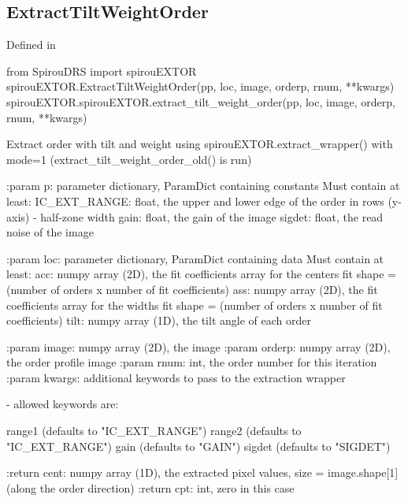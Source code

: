 \begin{minipage}{\textwidth}
\subsection{ExtractTiltWeightOrder}

Defined in \spirouEXTOR{}

\begin{pythonbox}
from SpirouDRS import spirouEXTOR
spirouEXTOR.ExtractTiltWeightOrder(pp, loc, image, orderp, rnum, **kwargs)
spirouEXTOR.spirouEXTOR.extract_tilt_weight_order(pp, loc, image, orderp, rnum, **kwargs)
\end{pythonbox}

\begin{pythondocstring}
Extract order with tilt and weight using
spirouEXTOR.extract_wrapper() with mode=1
(extract_tilt_weight_order_old() is run)

:param p: parameter dictionary, ParamDict containing constants
    Must contain at least:
            IC_EXT_RANGE: float, the upper and lower edge of the order
                          in rows (y-axis) - half-zone width
            gain: float, the gain of the image
            sigdet: float, the read noise of the image

:param loc: parameter dictionary, ParamDict containing data
        Must contain at least:
            acc: numpy array (2D), the fit coefficients array for
                  the centers fit
                  shape = (number of orders x number of fit coefficients)
            ass: numpy array (2D), the fit coefficients array for
                  the widths fit
                  shape = (number of orders x number of fit coefficients)
            tilt: numpy array (1D), the tilt angle of each order

:param image: numpy array (2D), the image
:param orderp: numpy array (2D), the order profile image
:param rnum: int, the order number for this iteration
:param kwargs: additional keywords to pass to the extraction wrapper

        - allowed keywords are:

        range1  (defaults to "IC_EXT_RANGE")
        range2  (defaults to "IC_EXT_RANGE")
        gain    (defaults to "GAIN")
        sigdet  (defaults to "SIGDET")

:return cent: numpy array (1D), the extracted pixel values,
             size = image.shape[1] (along the order direction)
:return cpt: int, zero in this case
\end{pythondocstring}
\end{minipage}

